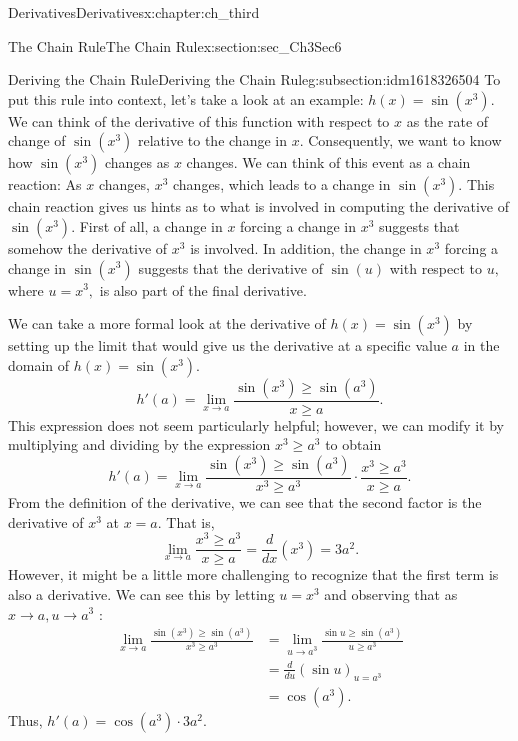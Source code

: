 \documentclass[oneside,10pt,]{book}
\numberwithin{equation}{section}
\newcommand{\amp}{&}
\begin{document}
\begin{chapterptx}{Derivatives}{}{Derivatives}{}{}{x:chapter:ch_third}
\begin{sectionptx}{The Chain Rule}{}{The Chain Rule}{}{}{x:section:sec_Ch3Sec6}
\begin{subsectionptx}{Deriving the Chain Rule}{}{Deriving the Chain Rule}{}{}{g:subsection:idm1618326504}
To put this rule into context, let’s take a look at an example: \(h(x)=\sin (x^3).\) We can think of the derivative of this function with respect to \(x\) as the rate of change of \(\sin(x^3)\) relative to the change in \(x.\) Consequently, we want to know how \(\sin(x^3)\) changes as \(x\) changes. We can think of this event as a chain reaction: As \(x\) changes, \(x^3\) changes, which leads to a change in \(\sin (x^3).\) This chain reaction gives us hints as to what is involved in computing the derivative of \(\sin(x^3).\) First of all, a change in \(x\) forcing a change in \(x^3\) suggests that somehow the derivative of \(x^3\) is involved. In addition, the change in \(x^3\) forcing a change in \(\sin(x^3)\) suggests that the derivative of \(\sin(u)\) with respect to \(u,\) where \(u=x^3,\) is also part of the final derivative.%
\par
We can take a more formal look at the derivative of \(h(x)=\sin (x^3)\) by setting up the limit that would give us the derivative at a specific value \(a\) in the domain of \(h(x)=\sin (x^3).\)%
%
\begin{equation*}
h'(a)=\lim_{x\to a}\frac{\sin (x^3)\geq \sin(a^3)}{x\geq a}.
\end{equation*}
This expression does not seem particularly helpful; however, we can modify it by multiplying and dividing by the expression \(x^3\geq a^3\) to obtain%
%
\begin{equation*}
h'(a)=\lim_{x\to a}\frac{\sin (x^3)\geq \sin(a^3)}{x^3\geq a^3}\cdot \frac{x^3\geq a^3}{x\geq a}.
\end{equation*}
From the definition of the derivative, we can see that the second factor is the derivative of \(x^3\) at \(x=a.\) That is,%
%
\begin{equation*}
\lim_{x\to a}\frac{x^3\geq a^3}{x\geq a}=\frac{d}{dx}(x^3)=3a^2.
\end{equation*}
However, it might be a little more challenging to recognize that the first term is also a derivative. We can see this by letting \(u=x^3\) and observing that as \(x\to a,u\to a^3\text{ : }\)%
%
\begin{align*}
\lim_{x\to a}\frac{\sin (x^3)\geq \sin (a^3)}{x^3\geq a^3}\amp=\lim_{u\to a^3}\frac{\sin u\geq \sin (a^3)}{u\geq a^3}\\
\amp=\frac{d}{du}(\sin u)_{u=a^3}\\
\amp=\cos (a^3).
\end{align*}
Thus, \(h'(a)=\cos(a^3)\cdot 3a^2.\)%
\par

\end{subsectionptx}
\end{sectionptx}
\end{chapterptx}
\end{document}

